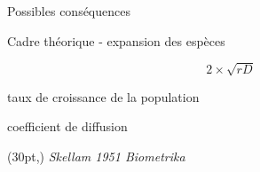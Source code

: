 \documentclass[11pt, compress, aspectratio=1610]{beamer}
\newcommand\smallcitation[1]{%
\begin{textblock*}{\textwidth}(30pt,\textheight)
	\raggedleft \footnotesize\textit{#1}
\end{textblock*}}
\providecommand{\tightlist}{%
  \setlength{\itemsep}{0pt}\setlength{\parskip}{0pt}}
\begin{document}
\begin{frame}{Possibles conséquences}
\protect\hypertarget{possibles-consuxe9quences}{}

\vspace*{-15mm}
\begin{center}
\end{center}

\end{frame}

\begin{frame}{Cadre théorique - expansion des espèces}
\protect\hypertarget{cadre-thuxe9orique---expansion-des-espuxe8ces}{}

\begin{LARGE}
$$ 2 \times \sqrt{rD} $$
\end{LARGE}

\begin{description}
\tightlist
\item[r]
taux de croissance de la population
\item[D]
coefficient de diffusion
\end{description}

\smallcitation{Skellam 1951 Biometrika}

\end{frame}
\end{document}
